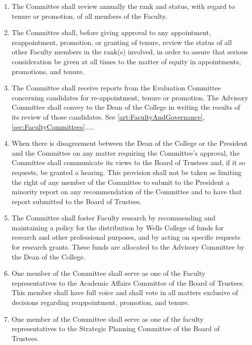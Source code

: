 \documentclass{manual}
\newcommand{\itemLevelA}{\alph*.}
\newcommand{\itemLevelB}{\arabic*)}
\newcommand{\itemRefA}{\alph*}
\newcommand{\itemRefB}{\arabic*}
\begin{document}
\begin{enumerate}[label=\itemLevelA,ref=\itemRefA]
\begin{enumerate}[label=\itemLevelB,ref=\itemRefB]
\item The Committee shall review annually the rank and status, with regard to tenure or promotion, of all members of the Faculty.

\item The Committee shall, before giving approval to any appointment, reappointment, promotion, or granting of tenure, review the status of all other Faculty members in the rank(s) involved, in order to assure that serious consideration be given at all times to the matter of equity in appointments, promotions, and tenure.

\item The Committee shall receive reports from the Evaluation Committee concerning candidates for re-appointment, tenure or promotion. The Advisory Committee shall convey to the Dean of the College in writing the results of its review of those candidates. See \cref{art:FacultyAndGovernance}, \cref{sec:FacultyCommittees}.....

\item When there is disagreement between the Dean of the College or the President and the Committee on any matter requiring the Committee's approval, the Committee shall communicate its views to the Board of Trustees and, if it so requests, be granted a hearing. This provision shall not be taken as limiting the right of any member of the Committee to submit to the President a minority report on any recommendation of the Committee and to have that report submitted to the Board of Trustees.

\item The Committee shall foster Faculty research by recommending and maintaining a policy for the distribution by Wells College of funds for research and other professional purposes, and by acting on specific requests for research grants. These funds are allocated to the Advisory Committee by the Dean of the College.

\item One member of the Committee shall serve as one of the Faculty representatives to the Academic Affairs Committee of the Board of Trustees. This member shall have full voice and shall vote in all matters exclusive of decisions regarding reappointment, promotion, and tenure.

\item One member of the Committee shall serve as one of the faculty representatives to the Strategic Planning Committee of the Board of Trustees.


\end{enumerate}
\end{enumerate}
\end{document}
